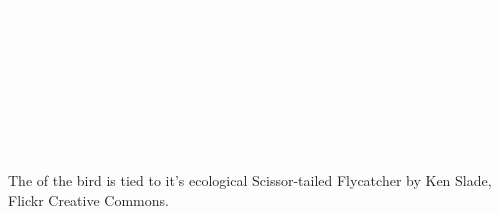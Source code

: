 \documentclass[t]{beamer}
\begin{document}

{
\begin{frame}[b,plain]
	\tiny\hspace{4em}\textcolor{white}{Carolina Wren by Ken Slade, Flickr Creative Commons.}
\end{frame}
}


{
\begin{frame}[t,plain]
	\vspace{7em}
	
	\hangpara\Large\hspace{14em}\textcolor{white}{41 orders}

	\hangpara\Large\hspace{14em}\textcolor{white}{249 families}
	
	
	\hangpara\Large\hspace{14em}\textcolor{white}{\textasciitilde10,906 species}

\vfilll

\tinyfill \textcolor{white}{Brown Thrasher \copyright Dustin Siegel, All Rights Reserved. Used with permission.}

\end{frame}
}


{
\begin{frame}[b,plain]{The  of the bird is tied to it’s ecological }
	\hfill\tiny Scissor-tailed Flycatcher by Ken Slade, Flickr Creative Commons.
\end{frame}
}
\end{document}
